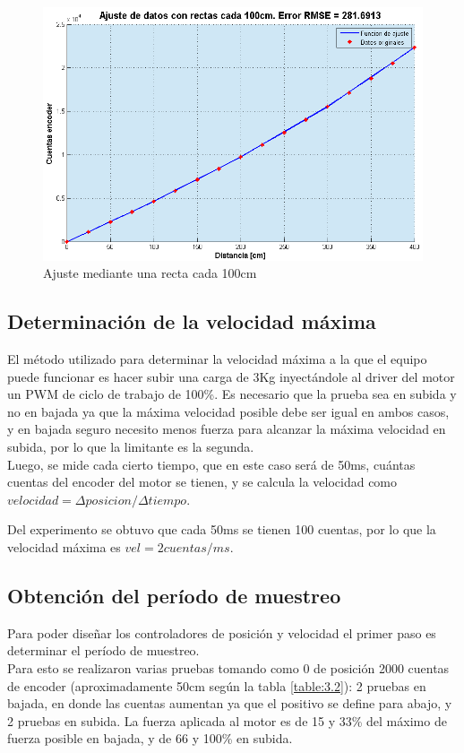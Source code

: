 \begin{figure}[!ht]
	\centering
	\includegraphics[width=15cm,scale=1]{resources/3_13-ajusteRectas100cm.png}
	\caption{Ajuste mediante una recta cada 100cm}
	\label{fig:\thefigure}
\end{figure}


\subsection{Determinación de la velocidad máxima}
El método utilizado para determinar la velocidad máxima a la que el equipo puede funcionar es hacer subir una carga de 3Kg inyectándole al driver del  motor un PWM de ciclo de trabajo de 100\%. Es necesario que la prueba sea en subida y no en bajada ya que la máxima velocidad posible debe ser igual en ambos casos, y en bajada seguro necesito menos fuerza para alcanzar la máxima velocidad en subida, por lo que la limitante es la segunda. \\
Luego, se mide cada cierto tiempo, que en este caso será de 50ms, cuántas cuentas del encoder del motor se tienen, y se calcula la velocidad como \(velocidad = \Delta posicion/\Delta tiempo \).

Del experimento se obtuvo que cada 50ms se tienen 100 cuentas, por lo que la velocidad máxima es \(vel = 2cuentas/ms\).

\subsection{Obtención del período de muestreo}
Para poder diseñar los controladores de posición y velocidad el primer paso es determinar el período de muestreo. \\
Para esto se realizaron varias pruebas tomando como 0 de posición 2000 cuentas de encoder (aproximadamente 50cm según la tabla \ref{table:3.2}): 2 pruebas en bajada, en donde las cuentas aumentan ya que el positivo se define para abajo, y 2 pruebas en subida. La fuerza aplicada al motor es de 15 y 33\% del máximo de fuerza posible en bajada, y de 66 y 100\% en subida.



